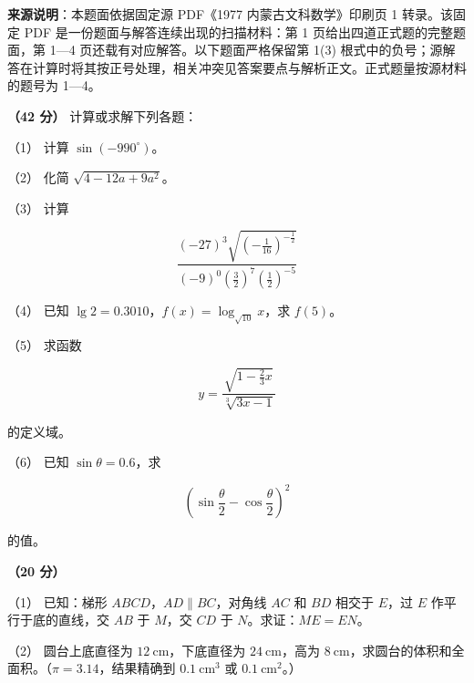 


\begin{gktip}
\textbf{来源说明}：本题面依据固定源 PDF《1977 内蒙古文科数学》印刷页 1 转录。该固定 PDF 是一份题面与解答连续出现的扫描材料：第 1 页给出四道正式题的完整题面，第 1—4 页还载有对应解答。以下题面严格保留第 1(3) 根式中的负号；源解答在计算时将其按正号处理，相关冲突见答案要点与解析正文。正式题量按源材料的题号为 1—4。
\end{gktip}

\begin{question}
\textbf{（42 分）} 计算或求解下列各题：

（1） 计算 $\sin(-990^\circ)$。

（2） 化简 $\sqrt{4-12a+9a^2}$。

（3） 计算

\nopagebreak[4]
\[
\frac{(-27)^3\sqrt{\left(-\frac{1}{16}\right)^{-\frac12}}}
{(-9)^0\left(\frac32\right)^7\left(\frac12\right)^{-5}}
\]

（4） 已知 $\lg2=0.3010$，$f(x)=\log_{\sqrt{10}}x$，求 $f(5)$。

（5） 求函数

\nopagebreak[4]
\[
y=\frac{\sqrt{1-\frac23x}}{\sqrt[3]{3x-1}}
\]

的定义域。

（6） 已知 $\sin\theta=0.6$，求

\nopagebreak[4]
\[
\left(\sin\frac\theta2-\cos\frac\theta2\right)^2
\]

的值。

\Needspace{0.4\textheight}
\end{question}
\begin{question}
\textbf{（20 分）} 

（1） 已知：梯形 $ABCD$，$AD\parallel BC$，对角线 $AC$ 和 $BD$ 相交于 $E$，过 $E$ 作平行于底的直线，交 $AB$ 于 $M$，交 $CD$ 于 $N$。求证：$ME=EN$。
\nopagebreak[4]
\begin{center}\end{center}
\nopagebreak[4]
（2） 圆台上底直径为 $12\ \mathrm{cm}$，下底直径为 $24\ \mathrm{cm}$，高为 $8\ \mathrm{cm}$，求圆台的体积和全面积。（$\pi=3.14$，结果精确到 $0.1\ \mathrm{cm^3}$ 或 $0.1\ \mathrm{cm^2}$。）

\end{question}
